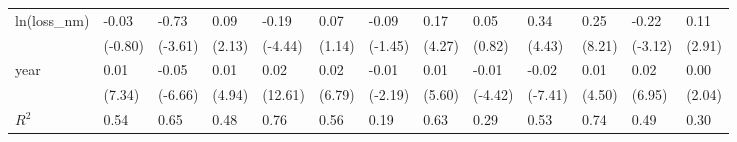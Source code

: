 \begin{tabular}{p{1.5cm} p{1.7cm} p{1.7cm} p{1.7cm}  p{1.7cm} p{1.7cm} p{1.7cm} p{1.7cm} p{1.7cm}  p{1.7cm} p{1.7cm} p{1.7cm} p{1.7cm} }
\hline
ln(loss\_nm)     &    -0.03         &    -0.73\sym{***}&     0.09\sym{*}  &    -0.19\sym{***}&     0.07         &    -0.09         &     0.17\sym{***}&     0.05         &     0.34\sym{***}&     0.25\sym{***}&    -0.22\sym{**} &     0.11\sym{**} \\
                &  (-0.80)         &  (-3.61)         &   (2.13)         &  (-4.44)         &   (1.14)         &  (-1.45)         &   (4.27)         &   (0.82)         &   (4.43)         &   (8.21)         &  (-3.12)         &   (2.91)         \\
year            &     0.01\sym{***}&    -0.05\sym{***}&     0.01\sym{***}&     0.02\sym{***}&     0.02\sym{***}&    -0.01\sym{*}  &     0.01\sym{***}&    -0.01\sym{***}&    -0.02\sym{***}&     0.01\sym{***}&     0.02\sym{***}&     0.00\sym{*}  \\
                &   (7.34)         &  (-6.66)         &   (4.94)         &  (12.61)         &   (6.79)         &  (-2.19)         &   (5.60)         &  (-4.42)         &  (-7.41)         &   (4.50)         &   (6.95)         &   (2.04)         \\
\hline
\(R^{2}\)       &     0.54         &     0.65         &     0.48         &     0.76         &     0.56         &     0.19         &     0.63         &     0.29         &     0.53         &     0.74         &     0.49         &     0.30         \\
\end{tabular}
